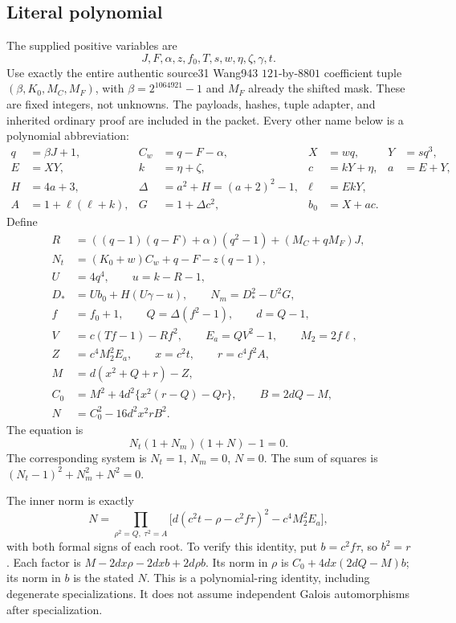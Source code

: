 \subsection{Literal polynomial}
The supplied positive variables are
\[
 J,F,\alpha,z,f_0,T,s,w,\eta,\zeta,\gamma,t.
\]
Use exactly the entire authentic source31 Wang943 $121$-by-$8801$ coefficient
tuple $(\beta,K_0,M_C,M_F)$, with $\beta=2^{1064921}-1$ and $M_F$ already
the shifted mask. These are fixed integers, not unknowns. The payloads,
hashes, tuple adapter, and inherited ordinary proof are included in the
packet. Every other name below is a polynomial abbreviation:
\begin{align*}
q&=\beta J+1,& C_w&=q-F-\alpha,& X&=wq,&Y&=sq^3,\\
E&=XY,&k&=\eta+\zeta,&c&=kY+\eta,&a&=E+Y,\\
H&=4a+3,&\Delta&=a^2+H=(a+2)^2-1,&\ell&=EkY,\\
A&=1+\ell(\ell+k),&G&=1+\Delta c^2,&b_0&=X+ac.
\end{align*}
Define
\begin{align*}
R&=((q-1)(q-F)+\alpha)(q^2-1)+(M_C+qM_F)J,\\
N_t&=(K_0+w)C_w+q-F-z(q-1),\\
U&=4q^4,\qquad u=k-R-1,\\
D_*&=Ub_0+H(U\gamma-u),\qquad N_m=D_*^2-U^2G,\\
f&=f_0+1,\qquad Q=\Delta(f^2-1),\qquad d=Q-1,\\
V&=c(Tf-1)-Rf^2,\qquad E_a=QV^2-1,\qquad M_2=2f\ell,\\
Z&=c^4M_2^2 E_a,\qquad x=c^2t,\qquad r=c^4f^2A,\\
M&=d(x^2+Q+r)-Z,\\
C_0&=M^2+4d^2\{x^2(r-Q)-Qr\},\qquad B=2dQ-M,\\
N&=C_0^2-16d^2x^2rB^2.
\end{align*}
The equation is
\begin{equation}
 \boxed{\;N_t(1+N_m)(1+N)-1=0.\;}             \label{eq:ordinary316}
\end{equation}
The corresponding system is $N_t=1$, $N_m=0$, $N=0$. The sum of squares
is $(N_t-1)^2+N_m^2+N^2=0$.

The inner norm is exactly
\begin{equation}
 N=\prod_{\rho^2=Q,\;\tau^2=A}
 \bigl[d(c^2t-\rho-c^2f\tau)^2-c^4M_2^2E_a\bigr],
 \label{eq:ordinary-norm}
\end{equation}
with both formal signs of each root. To verify this identity, put
$b=c^2f\tau$, so $b^2=r$. Each factor is
$M-2dx\rho-2dxb+2d\rho b$. Its norm in $\rho$ is
$C_0+4dx(2dQ-M)b$; its norm in $b$ is the stated $N$.
This is a polynomial-ring identity, including degenerate specializations.
It does not assume independent Galois automorphisms after specialization.

